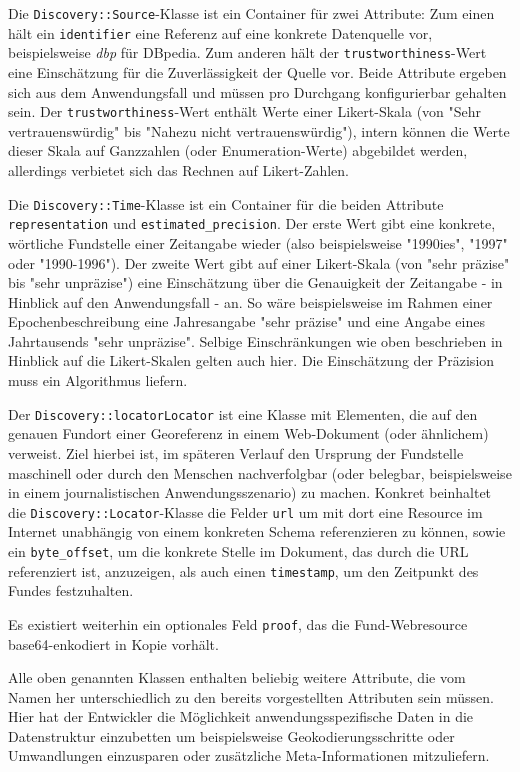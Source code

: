 Die \texttt{Discovery::Source}-Klasse ist ein Container für zwei Attribute: Zum einen hält ein \texttt{identifier} eine Referenz auf eine konkrete Datenquelle vor, beispielsweise \textit{dbp} für DBpedia. Zum anderen hält der \texttt{trustworthiness}-Wert eine Einschätzung für die Zuverlässigkeit der Quelle vor. Beide Attribute ergeben sich aus dem Anwendungsfall und müssen pro Durchgang konfigurierbar gehalten sein. Der \texttt{trustworthiness}-Wert enthält Werte einer Likert-Skala (von "Sehr vertrauenswürdig" bis "Nahezu nicht vertrauenswürdig"), intern können die Werte dieser Skala auf Ganzzahlen (oder Enumeration-Werte) abgebildet werden, allerdings verbietet sich das Rechnen auf Likert-Zahlen.

Die \texttt{Discovery::Time}-Klasse ist ein Container für die beiden Attribute \texttt{representation} und \texttt{estimated\_precision}. Der erste Wert gibt eine konkrete, wörtliche Fundstelle einer Zeitangabe wieder (also beispielsweise "1990ies", "1997" oder "1990-1996"). Der zweite Wert gibt auf einer Likert-Skala (von "sehr präzise" bis "sehr unpräzise") eine Einschätzung über die Genauigkeit der Zeitangabe - in Hinblick auf den Anwendungsfall - an. So wäre beispielsweise im Rahmen einer Epochenbeschreibung eine Jahresangabe "sehr präzise" und eine Angabe eines Jahrtausends "sehr unpräzise". Selbige Einschränkungen wie oben beschrieben in Hinblick auf die Likert-Skalen gelten auch hier. Die Einschätzung der Präzision muss ein Algorithmus liefern.

Der \texttt{Discovery::locatorLocator} ist eine Klasse mit Elementen, die auf den genauen Fundort einer Georeferenz in einem Web-Dokument (oder ähnlichem) verweist. Ziel hierbei ist, im späteren Verlauf den Ursprung der Fundstelle maschinell oder durch den Menschen nachverfolgbar (oder belegbar, beispielsweise in einem journalistischen Anwendungsszenario) zu machen. Konkret beinhaltet die \texttt{Discovery::Locator}-Klasse die Felder \texttt{url} um mit dort eine Resource im Internet unabhängig von einem konkreten Schema referenzieren zu können, sowie ein \texttt{byte\_offset}, um die konkrete Stelle im Dokument, das durch die URL referenziert ist, anzuzeigen, als auch einen \texttt{timestamp}, um den Zeitpunkt des Fundes festzuhalten.
  
Es existiert weiterhin ein optionales Feld \texttt{proof}, das die Fund-Webresource base64-enkodiert in Kopie vorhält.

Alle oben genannten Klassen enthalten beliebig weitere Attribute, die vom Namen her unterschiedlich zu den bereits vorgestellten Attributen sein müssen. Hier hat der Entwickler die Möglichkeit anwendungsspezifische Daten in die Datenstruktur einzubetten um beispielsweise Geokodierungsschritte oder Umwandlungen einzusparen oder zusätzliche Meta-Informationen mitzuliefern.


